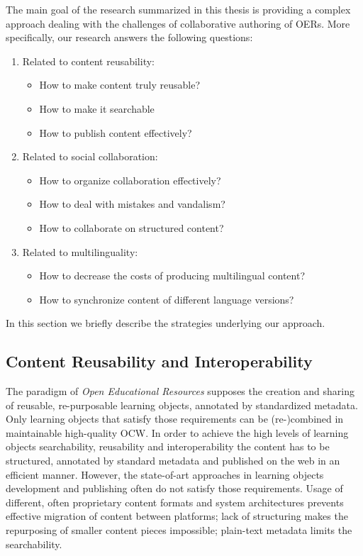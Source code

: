 \documentclass[ngerman,UKenglish,table]{scrbook}
\begin{document}
The main goal of the research summarized in this thesis is providing a complex approach dealing with the challenges of collaborative authoring of OERs.
More specifically, our research answers the following questions:
\begin{enumerate}
\item Related to content reusability: 
\begin{itemize}
\item How to make content truly reusable?
\item How to make it searchable
\item How to publish content effectively?
\end{itemize} 
\item Related to social collaboration: 
\begin{itemize}
\item How to organize collaboration effectively?
\item How to deal with mistakes and vandalism?
\item How to collaborate on structured content?
\end{itemize}
\item Related to multilinguality: 
\begin{itemize}
\item How to decrease the costs of producing multilingual content?
\item How to synchronize content of different language versions?
\end{itemize}
\end{enumerate}
In this section we briefly describe the strategies underlying our approach.

\subsection{Content Reusability and Interoperability}
\label{sec:content_reusability_structuring}
The paradigm of \emph{Open Educational Resources} supposes the creation and sharing of reusable, re-purposable learning objects, annotated by standardized metadata.
Only learning objects that satisfy those requirements can be (re-)combined in maintainable high-quality OCW.
In order to achieve the high levels of learning objects searchability, reusability and interoperability the content has to be structured, annotated by standard metadata and  published on the web in an efficient manner.
However, the state-of-art approaches in learning objects development and publishing often do not satisfy those requirements.
Usage of different, often proprietary content formats and system architectures prevents effective migration of content between platforms; lack of structuring makes the repurposing of smaller content pieces impossible; plain-text metadata limits the searchability.
\end{document}
